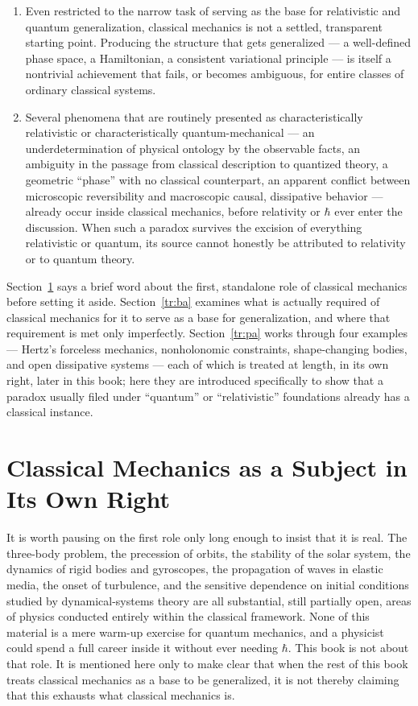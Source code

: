 \begin{enumerate}
  \item[(a)] Even restricted to the narrow task of serving as the base for
  relativistic and quantum generalization, classical mechanics is not a settled,
  transparent starting point. Producing the structure that gets generalized ---
  a well-defined phase space, a Hamiltonian, a consistent variational principle
  --- is itself a nontrivial achievement that fails, or becomes ambiguous, for
  entire classes of ordinary classical systems.
  \item[(b)] Several phenomena that are routinely presented as characteristically
  relativistic or characteristically quantum-mechanical --- an underdetermination
  of physical ontology by the observable facts, an ambiguity in the passage from
  classical description to quantized theory, a geometric ``phase'' with no
  classical counterpart, an apparent conflict between microscopic reversibility
  and macroscopic causal, dissipative behavior --- already occur inside classical
  mechanics, before relativity or $\hbar$ ever enter the discussion. When such a
  paradox survives the excision of everything relativistic or quantum, its source
  cannot honestly be attributed to relativity or to quantum theory.
\end{enumerate}

Section~\ref{tr:st} says a brief word about the first, standalone role
of classical mechanics before setting it aside. Section~\ref{tr:ba} examines
what is actually required of classical mechanics for it to serve as a base for
generalization, and where that requirement is met only imperfectly.
Section~\ref{tr:pa} works through four examples --- Hertz's forceless
mechanics, nonholonomic constraints, shape-changing bodies, and open dissipative
systems --- each of which is treated at length, in its own right, later in this
book; here they are introduced specifically to show that a paradox usually filed
under ``quantum'' or ``relativistic'' foundations already has a classical
instance.

\section{Classical Mechanics as a Subject in Its Own Right}
\label{tr:st}

It is worth pausing on the first role only long enough to insist that it is real.
The three-body problem, the precession of orbits, the stability of the solar
system, the dynamics of rigid bodies and gyroscopes, the propagation of waves in
elastic media, the onset of turbulence, and the sensitive dependence on initial
conditions studied by dynamical-systems theory are all substantial, still
partially open, areas of physics conducted entirely within the classical
framework. None of this material is a mere warm-up exercise for quantum mechanics,
and a physicist could spend a full career inside it without ever needing $\hbar$.
This book is not about that role. It is mentioned here only to make clear that
when the rest of this book treats classical mechanics as a base to be generalized,
it is not thereby claiming that this exhausts what classical mechanics is.

